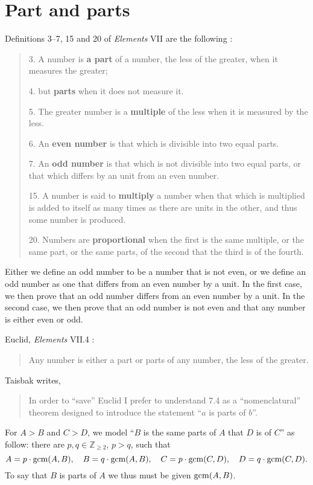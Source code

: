 \documentclass{article}
\newcommand{\gcm}{\ensuremath\mathrm{gcm}}
\begin{document}
\section{Part and parts}
Definitions 3--7, 15 and 20 of {\em Elements} VII are the following \cite[p.~277--278]{euclidII}:

\begin{quote}
3. A number is \textbf{a part} of a number, the less of the
greater, when it measures the greater;

4. but \textbf{parts} when it does not measure it.

5. The greater number is a \textbf{multiple} of the less when it is measured by the less.

6. An \textbf{even number} is that which is divisible into two equal parts.

7. An \textbf{odd number} is that which is not divisible into
two equal parts, or that which differs by an unit from an
even number.

15. A number is said to \textbf{multiply}  a number when that
which is multiplied is added to itself as many times as there
are units in the other, and thus some number is produced.

20. Numbers are \textbf{proportional} when the first is the
same multiple, or the same part, or the same parts, of the
second that the third is of the fourth.
\end{quote}

Either we define an odd number to be a number that is not even, or we define an odd number as one that differs from an even number by a unit.
In the first case, we then prove that an odd number differs from an even number by a unit. In the second case, we then prove that
an odd number is not even and that any number is either even or odd. 

Euclid, {\em Elements} VII.4 \cite[p.~303]{euclidII}:

\begin{quote}
Any number is either a part or parts of any number, the 
less of the greater.
\end{quote}

Taisbak \cite[p.~31, Chapter 4]{taisbak} writes,

\begin{quote}
In order to ``save'' Euclid I prefer to understand 7.4 as a ``nomenclatural'' theorem
designed to introduce the statement ``$a$ is parts of $b$''.
\end{quote}

For $A>B$ and $C>D$,
we model ``$B$ is the same parts of $A$ that $D$ is of $C$'' as follow: 
there are $p,q \in \mathbb{Z}_{\geq 2}$, $p>q$, such that
\[
A=p \cdot \gcm(A,B),\quad B=q \cdot \gcm(A,B),\quad C = p\cdot \gcm(C,D),\quad D = q \cdot \gcm(C,D).
\]
To say that $B$ is parts of $A$ we thus must be given $\gcm(A,B)$. 
\end{document}
